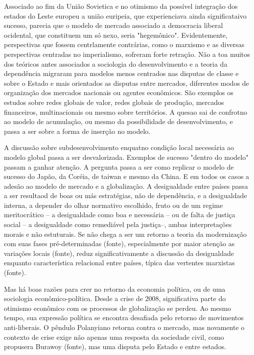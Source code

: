 Associado ao fim da União Sovietica e no otimismo da possível integração dos estados do Leste europeu a união euripeia, que experienciava ainda significataivo sucesso, parecia que o modelo de mercado associado a democracia liberal ocidental, que constituem um só nexo, seria "hegemônico". Evidentemente, perspectivas que fossem centrlamente contrárias, como o marxismo e as diversas perspectivas centradas no imperialismo, sofreram forte retração. Não a toa muitos dos teóricos antes associados a sociologia do desenvolvimento e a teoria da dependência migraram para modelos menos centrados nas disputas de classe e sobre o Estado e mais orientados as disputas entre mercados, diferentes modos de organização dos mercados nacionais ou agentes econômicos. São exemplos os estudos sobre redes globais de valor, redes globais de produção, mercados financeiros, multinacionais ou mesmo sobre territórios. A quesao sai de confrotno ao modelo de acumulação, ou mesmo da possibilidade de desenvolvimento, e passa a ser sobre a forma de inserção no modelo.

A discussão sobre subdesenvolvimento enquatno condição local necessária ao modelo global passa a ser desvalorizada. Exemplos de sucesso "dentro do modelo" passam a ganhar atenção. A pergunta passa a ser como replicar o modelo de sucesso do Japão, da Coréia, de taiwan e mesmo da China. E em todos os casos a adesão ao modelo de mercado e a globalização. A desigualdade entre países passa a ser resultaod de boas ou más estratégias, não de dependência, e a desigualdade interna, a depender do olhar normativo escolhido, fruto ou de um regime meritocrático -- a desigualdade como boa e necessária -- ou de falta de justiça social -- a desigualdade como remediável pela justiça--, ambas interpretações morais e não estuturais. Se não chega a ser um retorno a teoria da modernização com suas fases pré-determinadas (fonte), especialmente por maior atenção as variações locais (fonte), reduz significativamente a discussão da desigualdade enquanto característica relacional entre países, típica das vertentes marxistas (fonte).

Mas há boas razões para crer no retorno da economia política, ou de uma sociologia econômico-política. Desde a crise de 2008, significativa parte do otimismo econômico com os processos de globalização se perdeu. Ao mesmo tempo, sua expressão política se encontra desafiada pelo retorno de movimentos anti-liberais. O pêndulo Polanyiano retorna contra o mercado, mas novamente o contexto de crise exige não apenas uma resposta da sociedade civil, como propusera Burawoy (fonte), mas uma disputa pelo Estado e entre estados. 

